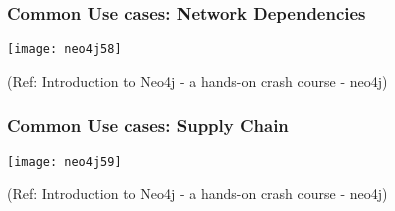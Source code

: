 \begin{frame}\frametitle{Common Use cases: Network Dependencies}



\begin{center}
\texttt{[image: neo4j58]}
\end{center}	

{\tiny (Ref: Introduction to Neo4j - a hands-on crash course - neo4j)}
\end{frame}


\begin{frame}\frametitle{Common Use cases: Supply Chain}



\begin{center}
\texttt{[image: neo4j59]}
\end{center}	

{\tiny (Ref: Introduction to Neo4j - a hands-on crash course - neo4j)}
\end{frame}

